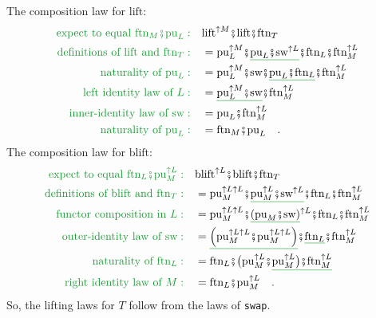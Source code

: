 The composition law for $\text{lift}$:
\begin{align*}
{\color{greenunder}\text{expect to equal }\text{ftn}_{M}\bef\text{pu}_{L}:}\quad & \text{lift}^{\uparrow M}\bef\text{lift}\bef\text{ftn}_{T}\\
{\color{greenunder}\text{definitions of }\text{lift}\text{ and }\text{ftn}_{T}:}\quad & =\text{pu}_{L}^{\uparrow M}\bef\gunderline{\text{pu}_{L}\bef\text{sw}^{\uparrow L}}\bef\text{ftn}_{L}\bef\text{ftn}_{M}^{\uparrow L}\\
{\color{greenunder}\text{naturality of }\text{pu}_{L}:}\quad & =\text{pu}_{L}^{\uparrow M}\bef\text{sw}\bef\gunderline{\text{pu}_{L}\bef\text{ftn}_{L}}\bef\text{ftn}_{M}^{\uparrow L}\\
{\color{greenunder}\text{left identity law of }L:}\quad & =\gunderline{\text{pu}_{L}^{\uparrow M}\bef\text{sw}}\bef\text{ftn}_{M}^{\uparrow L}\\
{\color{greenunder}\text{inner-identity law of }\text{sw}:}\quad & =\text{pu}_{L}\bef\text{ftn}_{M}^{\uparrow L}\\
{\color{greenunder}\text{naturality of }\text{pu}_{L}:}\quad & =\text{ftn}_{M}\bef\text{pu}_{L}\quad.
\end{align*}
The composition law for $\text{blift}$:
\begin{align*}
{\color{greenunder}\text{expect to equal }\text{ftn}_{L}\bef\text{pu}_{M}^{\uparrow L}:}\quad & \text{blift}^{\uparrow L}\bef\text{blift}\bef\text{ftn}_{T}\\
{\color{greenunder}\text{definitions of }\text{blift}\text{ and }\text{ftn}_{T}:}\quad & =\text{pu}_{M}^{\uparrow L\uparrow L}\bef\gunderline{\text{pu}_{M}^{\uparrow L}\bef\text{sw}^{\uparrow L}}\bef\text{ftn}_{L}\bef\text{ftn}_{M}^{\uparrow L}\\
{\color{greenunder}\text{functor composition in }L:}\quad & =\text{pu}_{M}^{\uparrow L\uparrow L}\bef\gunderline{\left(\text{pu}_{M}\bef\text{sw}\right)}^{\uparrow L}\bef\text{ftn}_{L}\bef\text{ftn}_{M}^{\uparrow L}\\
{\color{greenunder}\text{outer-identity law of }\text{sw}:}\quad & =\gunderline{\left(\text{pu}_{M}^{\uparrow L\uparrow L}\bef\text{pu}_{M}^{\uparrow L\uparrow L}\right)}\bef\gunderline{\text{ftn}_{L}}\bef\text{ftn}_{M}^{\uparrow L}\\
{\color{greenunder}\text{naturality of }\text{ftn}_{L}:}\quad & =\text{ftn}_{L}\bef\big(\text{pu}_{M}^{\uparrow L}\bef\gunderline{\text{pu}_{M}^{\uparrow L}\big)\bef\text{ftn}_{M}^{\uparrow L}}\\
{\color{greenunder}\text{right identity law of }M:}\quad & =\text{ftn}_{L}\bef\text{pu}_{M}^{\uparrow L}\quad.
\end{align*}
So, the lifting laws for $T$ follow from the laws of \lstinline!swap!.

